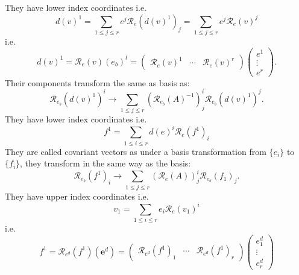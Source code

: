 \documentclass[aps,preprint]{revtex4}
\begin{document}
They have lower index coordinates i.e. 
\begin{equation}
d\left( v\right) ^{1}=\sum_{1\leq j\leq r}e^{j}\mathcal{R}_{e}\left( d\left(
v\right) ^{1}\right) _{j}=\sum_{1\leq j\leq r}e^{j}\mathcal{R}_{e}\left(
v\right) ^{j}
\end{equation}%
i.e.%
\begin{equation}
d\left( v\right) ^{1}=\mathcal{R}_{e}\left( v\right) \left( e_{b}\right)
^{t}=\left( 
\begin{array}{ccc}
\mathcal{R}_{e}\left( v\right) ^{1} & \cdots & \mathcal{R}_{e}\left(
v\right) ^{r}%
\end{array}%
\right) \left( 
\begin{array}{c}
e^{1} \\ 
\vdots \\ 
e^{r}%
\end{array}%
\right) .
\end{equation}%
Their components transform the same as basis as: 
\begin{equation*}
\mathcal{R}_{e_{b}}\left( d\left( v\right) ^{1}\right) ^{i}\rightarrow
\sum_{1\leq j\leq r}(\mathcal{R}_{e_{b}}\left( A\right) ^{-1})_{j}^{i}%
\mathcal{R}_{e_{b}}\left( d\left( v\right) ^{1}\right) ^{j}.
\end{equation*}%
They have lower index coordinates i.e. 
\begin{equation}
f^{1}=\sum_{1\leq i\leq r}d\left( e\right) ^{i}\mathcal{R}_{e}\left(
f^{1}\right) _{i}
\end{equation}%
They are called covariant vectors as under a basis transformation from $%
\{e_{i}\}$ to $\{f_{i}\}$, they transform in the same way as the basis: 
\begin{equation*}
\mathcal{R}_{e_{b}}\left( f^{1}\right) _{i}\rightarrow \sum_{1\leq j\leq r}(%
\mathcal{R}_{e}\left( A\right) )_{j}^{i}\mathcal{R}_{e_{b}}\left(
f_{1}\right) _{j}.
\end{equation*}%
They have upper index coordinates i.e. 
\begin{equation}
v_{1}=\sum_{1\leq i\leq r}e_{i}\mathcal{R}_{e}\left( v_{1}\right) ^{i}
\end{equation}%
i.e.%
\begin{equation}
f^{1}=\mathcal{R}_{e^{d}}\left( f^{1}\right) \left( \boldsymbol{e}%
^{d}\right) =\left( 
\begin{array}{ccc}
\mathcal{R}_{e^{d}}\left( f^{1}\right) _{1} & \cdots & \mathcal{R}%
_{e^{d}}\left( f^{1}\right) _{r}%
\end{array}%
\right) \left( 
\begin{array}{c}
e_{1}^{d} \\ 
\vdots \\ 
e_{r}^{d}%
\end{array}%
\right)
\end{equation}
\end{document}
